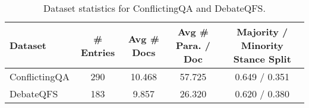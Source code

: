 \begin{table*}[]
\centering
\begin{tabular}{@{}lcccc@{}}
\toprule
\textbf{Dataset} & \textbf{\# Entries} & \textbf{Avg \# Docs} & \textbf{Avg \# Para. / Doc} & \textbf{Majority / Minority Stance Split} \\ \midrule
ConflictingQA & 290 & 10.468 & 57.725 & 0.649 / 0.351 \\
DebateQFS & 183 & 9.857 & 26.320 & 0.620 / 0.380 \\ \bottomrule
\end{tabular}
\caption{\label{appendix:table:dataset} Dataset statistics for ConflictingQA and DebateQFS.}
\end{table*}